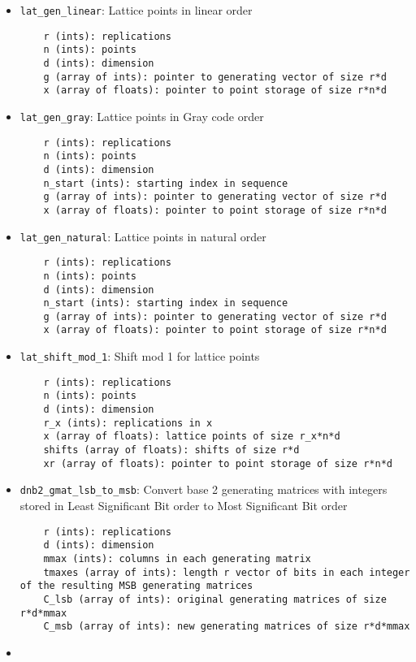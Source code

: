 \begin{itemize}
\item
\texttt{lat\_gen\_linear}: 
Lattice points in linear order
\begin{lstlisting}
	r (ints): replications
    n (ints): points
    d (ints): dimension
    g (array of ints): pointer to generating vector of size r*d
    x (array of floats): pointer to point storage of size r*n*d
\end{lstlisting}
\item
\texttt{lat\_gen\_gray}: 
Lattice points in Gray code order
\begin{lstlisting}
	r (ints): replications
    n (ints): points
    d (ints): dimension
    n_start (ints): starting index in sequence
    g (array of ints): pointer to generating vector of size r*d 
    x (array of floats): pointer to point storage of size r*n*d
\end{lstlisting}
\item
\texttt{lat\_gen\_natural}: 
Lattice points in natural order
\begin{lstlisting}
	r (ints): replications
    n (ints): points
    d (ints): dimension
    n_start (ints): starting index in sequence
    g (array of ints): pointer to generating vector of size r*d 
    x (array of floats): pointer to point storage of size r*n*d
\end{lstlisting}
\item
\texttt{lat\_shift\_mod\_1}: 
Shift mod 1 for lattice points
\begin{lstlisting}
	r (ints): replications
    n (ints): points
    d (ints): dimension
    r_x (ints): replications in x
    x (array of floats): lattice points of size r_x*n*d
    shifts (array of floats): shifts of size r*d
    xr (array of floats): pointer to point storage of size r*n*d
\end{lstlisting}
\item
\texttt{dnb2\_gmat\_lsb\_to\_msb}: 
Convert base 2 generating matrices with integers stored in Least Significant Bit order to Most Significant Bit order
\begin{lstlisting}
	r (ints): replications
    d (ints): dimension
    mmax (ints): columns in each generating matrix 
    tmaxes (array of ints): length r vector of bits in each integer of the resulting MSB generating matrices
    C_lsb (array of ints): original generating matrices of size r*d*mmax
    C_msb (array of ints): new generating matrices of size r*d*mmax
\end{lstlisting}
\item

\end{itemize}
